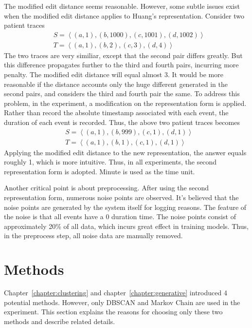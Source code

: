 The modified edit distance seems reasonable. However, some subtle issues exist when the modified edit distance applies to Huang's representation. Consider two patient traces 
\begin{align*}
	&S = \left\langle (a, 1), (b, 1000), (c, 1001), (d, 1002)\right\rangle 	\\
	&T = \left\langle(a, 1), (b, 2), (c, 3), (d, 4)\right\rangle 
\end{align*}
The two traces are very similiar, except that the second pair differs greatly. But this difference propagates further to the third and fourth pairs, incurring more penalty. The modified edit distance will equal almost 3. It would be more reasonable if the distance accounts only the huge different generated in the second pairs, and considers the third and fourth pair the same. To address this problem, in the experiment, a modification on the representation form is applied. Rather than record the absolute timestamp associated with each event, the duration of each event is recorded. Thus, the above two patient traces becomes
\begin{align*}
	&S = \left\langle (a, 1), (b, 999), (c, 1), (d, 1)\right\rangle 	\\
	&T = \left\langle(a, 1), (b, 1), (c, 1), (d, 1)\right\rangle 
\end{align*}
Applying the modified edit distance to the new representation, the answer equals roughly 1, which is more intuitive. Thus, in all experiments, the second representation form is adopted. Minute is used as the time unit.

Another critical point is about preprocessing. After using the second representation form, numerous noise points are observed. It's believed that the noise points are generated by the system itself for logging reasons. The feature of the noise is that all events have a 0 duration time. The noise points consist of approximately 20\% of all data, which incurs great effect in training models. Thus, in the preprocess step, all noise data are manually removed.

\section{Methods}
Chapter~\ref{chapter:clustering} and chapter~\ref{chapter:generative} introduced 4 potential methods. However, only DBSCAN and Markov Chain are used in the experiment. This section explains the reasons for choosing only these two methods and describe related details.

